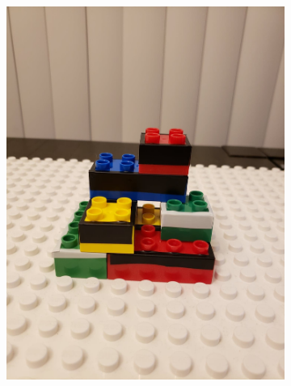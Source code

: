 \begin{figure}[H]
\begin{subfigure}{0.5\textwidth}
       \caption[{}]{\label{fig:fig_3-6c}}
    \end{subfigure}
    \begin{subfigure}{0.5\textwidth}
       \centering
       \includegraphics[width=0.8\linewidth,trim={0 15cm 0 15cm},clip]{figures/t4.jpg}
       

\end{subfigure}
\end{figure}
